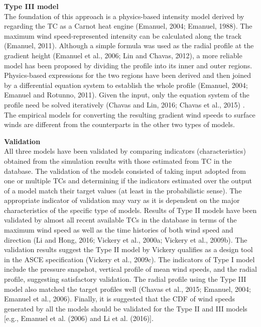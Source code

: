 \noindent\textbf{Type III model} \\The foundation of this approach is a physics-based intensity model derived by regarding the TC as a Carnot heat engine (Emanuel, 2004; Emanuel, 1988). The maximum wind speed-represented intensity can be calculated along the track (Emanuel, 2011). Although a simple formula was used as the radial profile at the gradient height (Emanuel et al., 2006; Lin and Chavas, 2012), a more reliable model has been proposed by dividing the profile into its inner and outer regions. Physics-based expressions for the two regions have been derived and then joined by a differential equation system to establish the whole profile (Emanuel, 2004; Emanuel and Rotunno, 2011). Given the input, only the equation system of the profile need be solved iteratively (Chavas and Lin, 2016; Chavas et al., 2015) . The empirical models for converting the resulting gradient wind speeds to surface winds are different from the counterparts in the other two types of models. 
\newline

\noindent\textbf{Validation} \\All three models have been validated by comparing indicators (characteristics) obtained from the simulation results with those estimated from TC in the database. The validation of the models consisted of taking input adopted from one or multiple TCs and determining if the indicators estimated over the output of a model match their target values (at least in the probabilistic sense). The appropriate indicator of validation may vary as it is dependent on the major characteristics of the specific type of models. Results of Type II models have been validated by almost all recent available TCs in the database in terms of the maximum wind speed as well as the time histories of both wind speed and direction (Li and Hong, 2016; Vickery et al., 2000a; Vickery et al., 2009b). The validation results suggest the Type II model by Vickery qualifies as a design tool in the ASCE specification (Vickery et al., 2009c). The indicators of Type I model include the pressure snapshot, vertical profile of mean wind speeds, and the radial profile, suggesting satisfactory validation. The radial profile using the Type III model also matched the target profiles well (Chavas et al., 2015; Emanuel, 2004; Emanuel et al., 2006). Finally, it is suggested that the CDF of wind speeds generated by all the models should be validated for the Type II and III models [e.g., Emanuel et al. (2006) and Li et al. (2016)]. 
\newline

